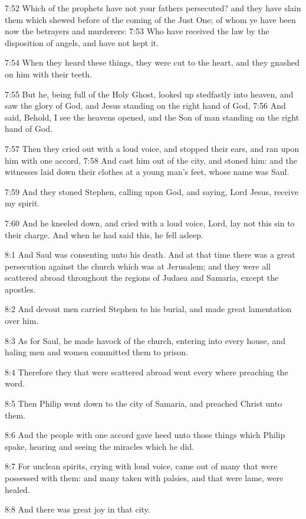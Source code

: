 7:52 Which of the prophets have not your fathers persecuted? and they have slain them which shewed before of the coming of the Just One; of whom ye have been now the betrayers and murderers: 7:53 Who have received the law by the disposition of angels, and have not kept it.

7:54 When they heard these things, they were cut to the heart, and they gnashed on him with their teeth.

7:55 But he, being full of the Holy Ghost, looked up stedfastly into heaven, and saw the glory of God, and Jesus standing on the right hand of God, 7:56 And said, Behold, I see the heavens opened, and the Son of man standing on the right hand of God.

7:57 Then they cried out with a loud voice, and stopped their ears, and ran upon him with one accord, 7:58 And cast him out of the city, and stoned him: and the witnesses laid down their clothes at a young man's feet, whose name was Saul.

7:59 And they stoned Stephen, calling upon God, and saying, Lord Jesus, receive my spirit.

7:60 And he kneeled down, and cried with a loud voice, Lord, lay not this sin to their charge. And when he had said this, he fell asleep.

8:1 And Saul was consenting unto his death. And at that time there was a great persecution against the church which was at Jerusalem; and they were all scattered abroad throughout the regions of Judaea and Samaria, except the apostles.

8:2 And devout men carried Stephen to his burial, and made great lamentation over him.

8:3 As for Saul, he made havock of the church, entering into every house, and haling men and women committed them to prison.

8:4 Therefore they that were scattered abroad went every where preaching the word.

8:5 Then Philip went down to the city of Samaria, and preached Christ unto them.

8:6 And the people with one accord gave heed unto those things which Philip spake, hearing and seeing the miracles which he did.

8:7 For unclean spirits, crying with loud voice, came out of many that were possessed with them: and many taken with palsies, and that were lame, were healed.

8:8 And there was great joy in that city.

